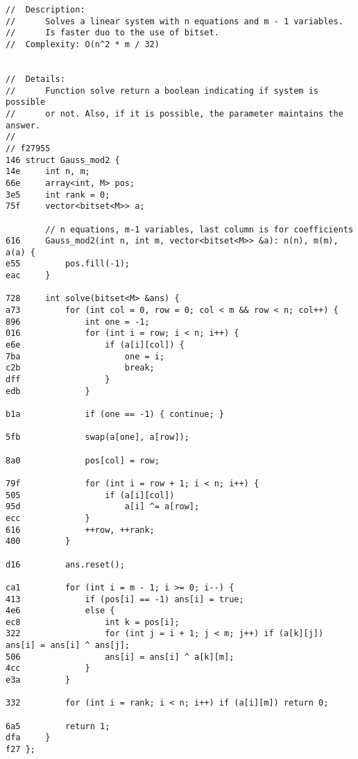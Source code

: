 \documentclass[11pt, a4paper, twoside]{article}
\begin{document}
\subsection{}
\begin{lstlisting}

//  Description: 
//      Solves a linear system with n equations and m - 1 variables.
//      Is faster duo to the use of bitset.
//  Complexity: O(n^2 * m / 32)


//  Details:
//      Function solve return a boolean indicating if system is possible
//      or not. Also, if it is possible, the parameter maintains the answer.
//
// f27955
146 struct Gauss_mod2 {
14e     int n, m;
66e     array<int, M> pos;
3e5     int rank = 0;
75f     vector<bitset<M>> a;
     
        // n equations, m-1 variables, last column is for coefficients
616     Gauss_mod2(int n, int m, vector<bitset<M>> &a): n(n), m(m), a(a) {
e55         pos.fill(-1);
eac     }
     
728     int solve(bitset<M> &ans) {
a73         for (int col = 0, row = 0; col < m && row < n; col++) {
896             int one = -1;
016             for (int i = row; i < n; i++) {
e6e                 if (a[i][col]) {
7ba                     one = i;
c2b                     break;
dff                 }
edb             }
     
b1a             if (one == -1) { continue; }
     
5fb             swap(a[one], a[row]);
     
8a0             pos[col] = row;
     
79f             for (int i = row + 1; i < n; i++) {
505                 if (a[i][col])
95d                     a[i] ^= a[row];
ecc             }
616             ++row, ++rank;
400         }
     
d16         ans.reset();
     
ca1         for (int i = m - 1; i >= 0; i--) {
413             if (pos[i] == -1) ans[i] = true;
4e6             else {
ec8                 int k = pos[i];
322                 for (int j = i + 1; j < m; j++) if (a[k][j]) ans[i] = ans[i] ^ ans[j];
506                 ans[i] = ans[i] ^ a[k][m];
4cc             }
e3a         }
     
332         for (int i = rank; i < n; i++) if (a[i][m]) return 0;
     
6a5         return 1;
dfa     }
f27 };
\end{lstlisting}
\end{document}
